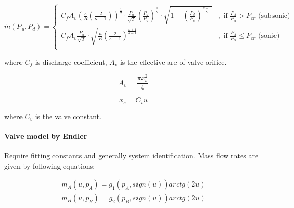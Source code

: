 \begin{equation}
    \dot{m}(P_u, P_d) = 
    \begin{cases}
        C_f A_v
        \left(\frac{\kappa}{R}\left(\frac{2}{\kappa-1}\right)\right)^{\frac{1}{2}}
        \cdot
        \frac{P_u}{\sqrt{T}}\left(\frac{P_d}{P_u}\right)^{\frac{1}{\kappa}}
        \cdot 
        \sqrt{1 - \left(\frac{P_d}{P_u}\right)^{\frac{\kappa-1}{\kappa}}} &,
            \text{ if } \frac{P_d}{P_u}>P_{cr} \text{ (subsonic)} \\
        C_f A_v \frac{P_u}{\sqrt{T}}\cdot \sqrt{\frac{\kappa}{R}
        \left(\frac{2}{\kappa + 1}\right)^{\frac{\kappa+1}{\kappa-1}}} &,
            \text{ if }  \frac{P_d}{P_u} \le P_{cr} \text{ (sonic)} \\
    \end{cases}
    \label{eq:valve_2}
\end{equation}

where $C_f$ is discharge coefficient, $A_v$ is the effective are of valve
orifice.

\begin{equation}
    A_v = \frac{\pi x_s^2}{4}
    \label{eq:A_v}
\end{equation}

\begin{equation}
    x_s = C_v u
    \label{eq:x_s}
\end{equation}

where $C_v$ is the valve constant.

\paragraph{Valve model by Endler}
Require fitting constants and generally system identification.
Mass flow rates are given by following equations:


\begin{equation}
    \begin{aligned}
        \dot{m}_A(u, p_A) = g_1(p_A, sign(u))arctg(2u) \\
        \dot{m}_B(u, p_B) = g_2(p_B, sign(u))arctg(2u)
    \end{aligned}
\end{equation}

